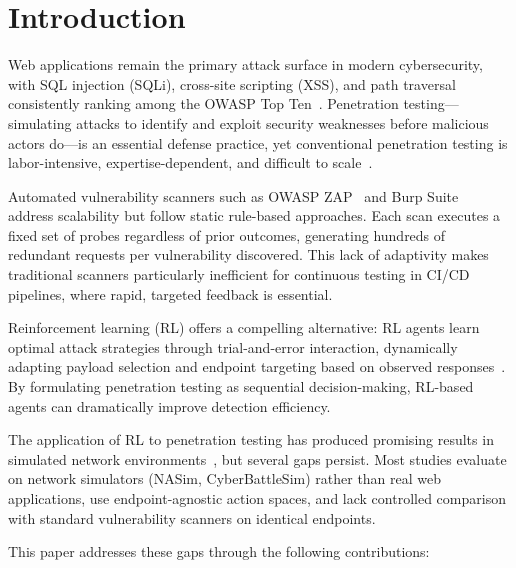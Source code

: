 \documentclass[5p,twocolumn]{elsarticle}
\begin{document}
\section{Introduction}
\label{sec:introduction}

Web applications remain the primary attack surface in modern cybersecurity, with SQL injection (SQLi), cross-site scripting (XSS), and path traversal consistently ranking among the OWASP Top Ten~\cite{owasp2021}. Penetration testing---simulating attacks to identify and exploit security weaknesses before malicious actors do---is an essential defense practice, yet conventional penetration testing is labor-intensive, expertise-dependent, and difficult to scale~\cite{holm2017}.

Automated vulnerability scanners such as OWASP ZAP~\cite{zap2024} and Burp Suite~\cite{burpsuite} address scalability but follow static rule-based approaches. Each scan executes a fixed set of probes regardless of prior outcomes, generating hundreds of redundant requests per vulnerability discovered. This lack of adaptivity makes traditional scanners particularly inefficient for continuous testing in CI/CD pipelines, where rapid, targeted feedback is essential.

Reinforcement learning (RL) offers a compelling alternative: RL agents learn optimal attack strategies through trial-and-error interaction, dynamically adapting payload selection and endpoint targeting based on observed responses~\cite{erdodi2022,zhou2021autonomous}. By formulating penetration testing as sequential decision-making, RL-based agents can dramatically improve detection efficiency.

The application of RL to penetration testing has produced promising results in simulated network environments~\cite{becker2024,ghanem2020,venturi2024}, but several gaps persist. Most studies evaluate on network simulators (NASim, CyberBattleSim) rather than real web applications, use endpoint-agnostic action spaces, and lack controlled comparison with standard vulnerability scanners on identical endpoints.

This paper addresses these gaps through the following contributions:
\end{document}
